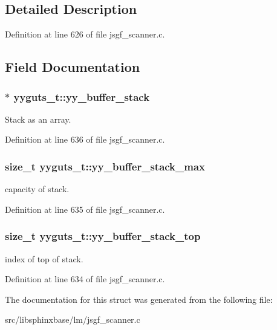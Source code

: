 \subsection{Detailed Description}


Definition at line 626 of file jsgf\-\_\-scanner.\-c.



\subsection{Field Documentation}
\subsubsection[{yy\-\_\-buffer\-\_\-stack}]{$\ast$ yyguts\-\_\-t\-::yy\-\_\-buffer\-\_\-stack}\label{structyyguts__t_ad0b9d576189d518a4482f20ed9b2a416}


Stack as an array. 



Definition at line 636 of file jsgf\-\_\-scanner.\-c.

\subsubsection[{yy\-\_\-buffer\-\_\-stack\-\_\-max}]{\setlength{\rightskip}{0pt plus 5cm}size\-\_\-t yyguts\-\_\-t\-::yy\-\_\-buffer\-\_\-stack\-\_\-max}\label{structyyguts__t_a4435bb91e87f9988b096afc21386289a}


capacity of stack. 



Definition at line 635 of file jsgf\-\_\-scanner.\-c.

\subsubsection[{yy\-\_\-buffer\-\_\-stack\-\_\-top}]{\setlength{\rightskip}{0pt plus 5cm}size\-\_\-t yyguts\-\_\-t\-::yy\-\_\-buffer\-\_\-stack\-\_\-top}\label{structyyguts__t_af92507d904af2fcd4509acde654a9850}


index of top of stack. 



Definition at line 634 of file jsgf\-\_\-scanner.\-c.



The documentation for this struct was generated from the following file\-:\begin{DoxyCompactItemize}
\item 
src/libsphinxbase/lm/jsgf\-\_\-scanner.\-c\end{DoxyCompactItemize}
